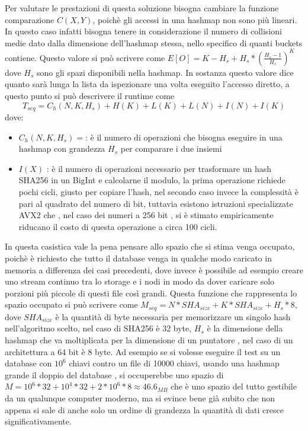 Per valutare le prestazioni di questa soluzione bisogna cambiare la funzione comparazione $C(X,Y)$, poichè gli accessi in una hashmap non sono più lineari. In questo caso infatti bisogna tenere in considerazione il numero di collisioni medie dato dalla dimensione dell'hashmap stessa, nello specifico di quanti buckets contiene. Questo valore si può scrivere come 
$E[O]=K-H_s +H_s *(\frac{H_s -1 }{H_s})^{K}$ dove $H_s$ sono gli spazi disponibili nella hashmap. In sostanza questo valore dice quanto sarà lunga la lista da ispezionare una volta eseguito l'accesso diretto, a questo punto  si può descrivere il runtime come 
$$
T_{seq}= C_h(N,K,H_s)+ H(K) + L(K) + L(N) + I(N) + I(K)
$$
dove:
\begin{itemize}
    \item $C_h(N,K,H_s)=$: è il numero di operazioni che bisogna eseguire in una hashmap con grandezza $H_s$ per comparare i due insiemi
    \item $I(X)$ : è il numero di operazioni necessario per trasformare un hash SHA256 in un BigInt e calcolarne il modulo, la prima operazione richiede pochi cicli, giusto per copiare l'hash, nel secondo caso invece la complessità è pari al quadrato del numero di bit, tuttavia esistono istruzioni specializzate AVX2 che , nel caso dei numeri a 256 bit , si è stimato empiricamente riducano il costo di questa operazione a circa 100 cicli.
\end{itemize}
 In questa casistica vale la pena pensare allo spazio che si stima venga occupato, poichè è richiesto che tutto il database venga in qualche modo caricato in memoria a differenza dei casi precedenti, dove invece è possibile ad esempio creare uno stream continuo tra lo storage e i nodi in modo da dover caricare solo porzioni più piccole di questi file così grandi. Questa funzione che rappresenta lo spazio occupato si può scrivere come  
$M_{seq}=N*SHA_{size}+K*SHA_{size}+H_s*8$, dove $SHA_{size}$ è la quantità di byte necessaria per memorizzare un singolo hash nell'algoritmo scelto, nel caso di SHA256 è 32 byte, $H_s$ è la dimensione della hashmap che va moltiplicata per la dimensione di un puntatore , nel caso di un architettura a 64 bit è 8 byte. Ad esempio se si volesse eseguire il test su un database con $10^6$ chiavi contro un file di 10000 chiavi, usando una hashmap grande il doppio del database , si occuperebbe uno spazio di 
$M=10^6*32+10^4*32+2* 10^6*8\approx46.6_{MB}$  che è uno spazio del tutto gestibile da un qualunque computer moderno, ma si evince bene già subito che non appena si sale di anche solo un ordine di grandezza la quantità di dati cresce significativamente. 

